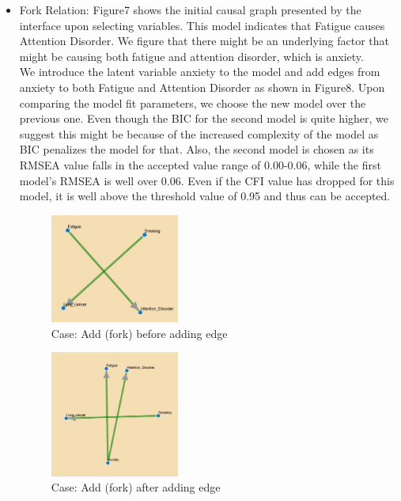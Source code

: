 \documentclass{vgtc}                          %
\begin{document}
\begin{itemize}
    \item Fork Relation: Figure7 shows the initial causal graph presented by the interface upon selecting variables. This model indicates that Fatigue causes Attention Disorder. We figure that there might be an underlying factor that might be causing both fatigue and attention disorder, which is anxiety. 
    \\[1em]
    We introduce the latent variable anxiety to the model and add edges from anxiety to both Fatigue and Attention Disorder as shown in Figure8. Upon comparing the model fit parameters, we choose the new model over the previous one. Even though the BIC for the second model is quite higher, we suggest this might be because of the increased complexity of the model as BIC penalizes the model for that. Also, the second model is chosen as its RMSEA value falls in the accepted value range of 0.00-0.06, while the first model's RMSEA is well over 0.06. Even if the CFI value has dropped for this model, it is well above the threshold value of 0.95 and thus can be accepted. 

    
    
    \begin{figure}[H]
      \caption{Case: Add (fork) before adding edge}
      \centering
      \includegraphics[width=0.4\textwidth]{c2_1}
    \end{figure}
    
    \begin{figure}[H]
      \caption{Case: Add (fork) after adding edge}
      \centering
      \includegraphics[width=0.4\textwidth]{c2_2}
    \end{figure}
    

\end{itemize}
\end{document}
